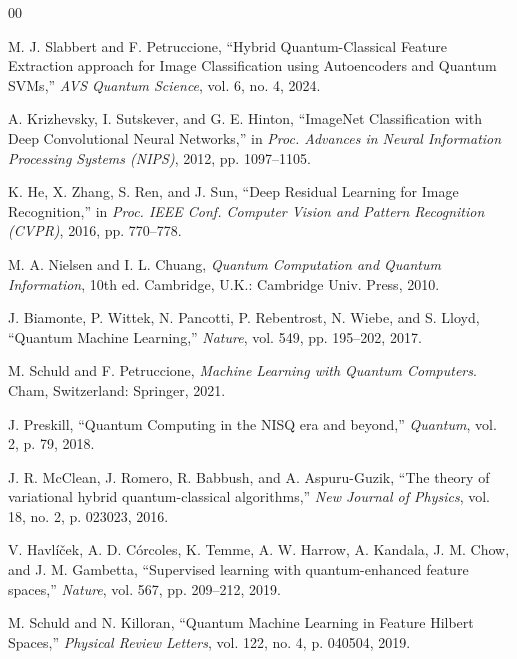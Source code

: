 \documentclass[conference]{IEEEtran}
\begin{document}
\begin{thebibliography}{00}

M. J. Slabbert and F. Petruccione, ``Hybrid Quantum-Classical Feature 
Extraction approach for Image Classification using Autoencoders and Quantum 
SVMs,'' \textit{AVS Quantum Science}, vol. 6, no. 4, 2024.

A. Krizhevsky, I. Sutskever, and G. E. Hinton, ``ImageNet Classification 
with Deep Convolutional Neural Networks,'' in \textit{Proc. Advances in 
Neural Information Processing Systems (NIPS)}, 2012, pp. 1097--1105.

K. He, X. Zhang, S. Ren, and J. Sun, ``Deep Residual Learning for Image 
Recognition,'' in \textit{Proc. IEEE Conf. Computer Vision and Pattern 
Recognition (CVPR)}, 2016, pp. 770--778.

M. A. Nielsen and I. L. Chuang, \textit{Quantum Computation and Quantum 
Information}, 10th ed. Cambridge, U.K.: Cambridge Univ. Press, 2010.

J. Biamonte, P. Wittek, N. Pancotti, P. Rebentrost, N. Wiebe, and 
S. Lloyd, ``Quantum Machine Learning,'' \textit{Nature}, vol. 549, 
pp. 195--202, 2017.

M. Schuld and F. Petruccione, \textit{Machine Learning with Quantum 
Computers}. Cham, Switzerland: Springer, 2021.

J. Preskill, ``Quantum Computing in the NISQ era and beyond,'' 
\textit{Quantum}, vol. 2, p. 79, 2018.

J. R. McClean, J. Romero, R. Babbush, and A. Aspuru-Guzik, ``The theory 
of variational hybrid quantum-classical algorithms,'' \textit{New Journal 
of Physics}, vol. 18, no. 2, p. 023023, 2016.

V. Havlíček, A. D. Córcoles, K. Temme, A. W. Harrow, A. Kandala, 
J. M. Chow, and J. M. Gambetta, ``Supervised learning with quantum-enhanced 
feature spaces,'' \textit{Nature}, vol. 567, pp. 209--212, 2019.

M. Schuld and N. Killoran, ``Quantum Machine Learning in Feature Hilbert 
Spaces,'' \textit{Physical Review Letters}, vol. 122, no. 4, p. 040504, 2019.


\end{thebibliography}
\end{document}
